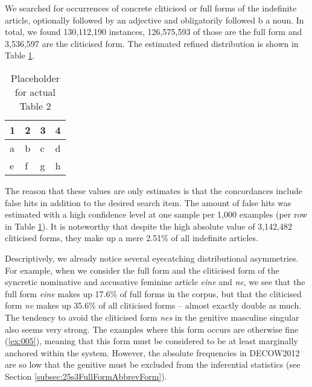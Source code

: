 We searched for occurrences of concrete cliticised or full forms of the indefinite article, optionally followed by an adjective and obligatorily followed b a noun.
In total, we found 130,112,190 instances, 126,575,593 of those are the full form and 3,536,597 are the cliticised form.
The estimated refined distribution is shown in Table \ref{tab:0002}.
\begin{table}
	\centering
	\begin{tabular}{llll}
		\toprule
		\textbf{1} & \textbf{2} & \textbf{3} & \textbf{4} \\
		\midrule
		a & b & c & d \\
		e & f & g & h \\
		\bottomrule
	\end{tabular}
	\caption{Placeholder for actual Table 2}
	\label{tab:0002}
\end{table}
The reason that these values are only estimates is that the concordances include false hits in addition to the desired search item.
The amount of false hits was estimated with a high confidence level at one sample per 1,000 examples (per row in Table \ref{tab:0002}).
It is noteworthy that despite the high absolute value of 3,142,482 cliticised forms, they make up a mere 2.51\% of all indefinite articles.

Descriptively, we already notice several eyecatching distributional asymmetries.
For example, when we consider the full form and the cliticised form of the syncretic nominative and accusative feminine article \textit{eine} and \textit{ne}, we see that the full form \textit{eine} makes up 17.6\% of full forms in the corpus, but that the cliticised form \textit{ne} makes up 35.6\% of all cliticised forms -- almost exactly double as much.
The tendency to avoid the cliticised form \textit{nes} in the genitive masculine singular also seems very strong.
The examples where this form occurs are otherwise fine (\ref{ex:005}), meaning that this form must be considered to be at least marginally anchored within the system. %
However, the absolute frequencies in DECOW2012 are so low that the genitive must be excluded from the inferential statistics (see Section \ref{subsec:25s3FullFormAbbrevForm}).

